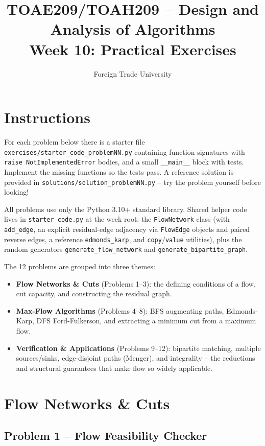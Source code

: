 \documentclass[11pt]{article}
\title{TOAE209/TOAH209 -- Design and Analysis of Algorithms\\[4pt]
\large Week 10: Practical Exercises}
\author{Foreign Trade University}
\date{}
\begin{document}
\maketitle

\section*{Instructions}

For each problem below there is a starter file
\texttt{exercises/starter\_code\_problemNN.py} containing function signatures with
\texttt{raise NotImplementedError} bodies, and a small \texttt{\_\_main\_\_} block with
tests. Implement the missing functions so the tests pass. A reference solution is
provided in \texttt{solutions/solution\_problemNN.py} -- try the problem yourself before
looking!

All problems use only the Python 3.10+ standard library. Shared helper code lives in
\texttt{starter\_code.py} at the week root: the \texttt{FlowNetwork} class (with
\texttt{add\_edge}, an explicit residual-edge adjacency via \texttt{FlowEdge} objects and
paired reverse edges, a reference \texttt{edmonds\_karp}, and \texttt{copy}/\texttt{value}
utilities), plus the random generators \texttt{generate\_flow\_network} and
\texttt{generate\_bipartite\_graph}.

The 12 problems are grouped into three themes:
\begin{itemize}
    \item \textbf{Flow Networks \& Cuts} (Problems 1--3): the defining conditions of a
    flow, cut capacity, and constructing the residual graph.
    \item \textbf{Max-Flow Algorithms} (Problems 4--8): BFS augmenting paths,
    Edmonds-Karp, DFS Ford-Fulkerson, and extracting a minimum cut from a maximum flow.
    \item \textbf{Verification \& Applications} (Problems 9--12): bipartite matching,
    multiple sources/sinks, edge-disjoint paths (Menger), and integrality -- the
    reductions and structural guarantees that make flow so widely applicable.
\end{itemize}

\newpage
\section{Flow Networks \& Cuts}

\subsection*{Problem 1 -- Flow Feasibility Checker}
\end{document}

